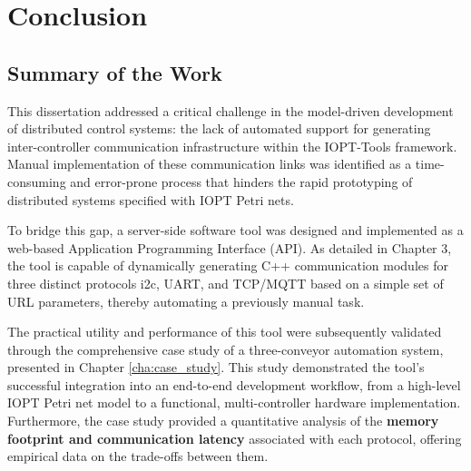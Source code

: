 
%

\chapter{Conclusion}
\label{cha:conclusion}

\section{Summary of the Work}
\label{sec:summary}

This dissertation addressed a critical challenge in the model-driven development of distributed control systems: the lack of automated support for generating inter-controller communication infrastructure within the IOPT-Tools framework. Manual implementation of these communication links was identified as a time-consuming and error-prone process that hinders the rapid prototyping of distributed systems specified with IOPT Petri nets.

To bridge this gap, a server-side software tool was designed and implemented as a web-based Application Programming Interface (API). As detailed in Chapter 3, the tool is capable of dynamically generating C++ communication modules for three distinct protocols \gls{i2c}, UART, and TCP/MQTT                                                                                                                                                                                                                                                                                                                                                                                                                                                                                                                                                      based on a simple set of URL parameters, thereby automating a previously manual task.

The practical utility and performance of this tool were subsequently validated through the comprehensive case study of a three-conveyor automation system, presented in Chapter \ref{cha:case_study}. This study demonstrated the tool's successful integration into an end-to-end development workflow, from a high-level IOPT Petri net model to a functional, multi-controller hardware implementation. Furthermore, the case study provided a quantitative analysis of the  \textbf{memory footprint and communication latency} associated with each protocol, offering empirical data on the trade-offs between them.


